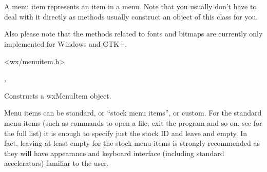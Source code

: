 
\section{}\label{wxmenuitem}

A menu item represents an item in a menu. Note that you usually don't have to
deal with it directly as  methods usually construct an
object of this class for you.

Also please note that the methods related to fonts and bitmaps are currently
only implemented for Windows and GTK+.




<wx/menuitem.h>


, 



\label{wxmenuitemctor}


Constructs a wxMenuItem object.

Menu items can be standard, or ``stock menu items'', or custom. For the
standard menu items (such as commands to open a file, exit the program and so
on, see  for the full list) it is enough to
specify just the stock ID and leave  and  empty. In
fact, leaving at least  empty for the stock menu items is strongly
recommended as they will have appearance and keyboard interface (including
standard accelerators) familiar to the user.

